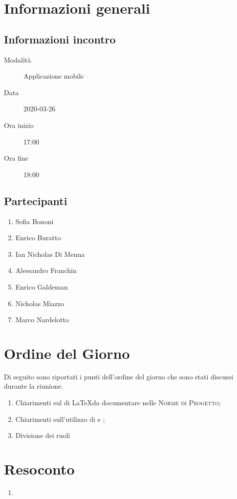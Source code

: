 \documentclass{article}
\begin{document}


\section{Informazioni generali}%
\label{sec:informazioni_generali}

\subsection{Informazioni incontro}%
\label{sub:informazioni_incontro}

\begin{description}
  \item[Modalità] Applicazione mobile 
  \item[Data] 2020-03-26
  \item[Ora inizio] 17:00
  \item[Ora fine] 18:00
\end{description}

\subsection{Partecipanti}%
\label{sub:partecipanti}

\begin{enumerate}
  \item Sofia Bononi
  \item Enrico Buratto
  \item Ian Nicholas Di Menna
  \item Alessandro Franchin
  \item Enrico Galdeman
  \item Nicholas Miazzo
  \item Marco Nardelotto
\end{enumerate}

\section{Ordine del Giorno}%
\label{ordine_del_giorno}
Di seguito sono riportati i punti dell'ordine del giorno che sono stati discussi durante la riunione.
\begin{enumerate}
  \item Chiarimenti sul  di \LaTeX da documentare nelle \textsc{Norme di Progetto};
  \item Chiarimenti sull'utilizzo di  e ;
  \item Divisione dei ruoli 
\end{enumerate}

\section{Resoconto}%
\label{resoconto}
\begin{enumerate}
  \item \textbf{}
\end{enumerate}
\end{document}
